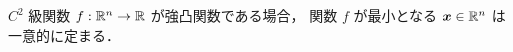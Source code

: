 \begin{theorem}
    $C^2$ 級関数 $f : \mathbb{R}^n \to \mathbb{R}$ が強凸関数である場合，
    関数 $f$ が最小となる $\bm{x} \in \mathbb{R}^n$ は一意的に定まる．
\end{theorem}





